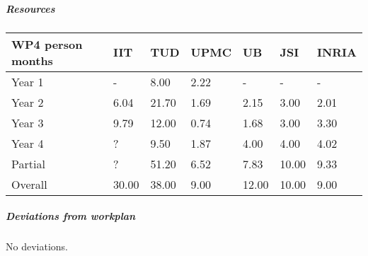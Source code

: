 
\subparagraph*{Resources}

\begin{center}
\begin{tabular}{|C{1.5cm}|C{1.5cm}|C{1.5cm}|C{2cm}|C{2cm}|C{2cm}|C{2cm}|}
\hline
\footnotesize \textbf{WP4 person months}& \footnotesize \textbf{IIT}&\footnotesize \textbf{TUD}&\footnotesize \textbf{UPMC}& \footnotesize \textbf{UB} &\footnotesize \textbf{JSI} &\footnotesize \textbf{INRIA}\\ \hline
\footnotesize Year 1  &  -        & 8.00   & 2.22 & -       & -        & -     \\  \hline
\footnotesize Year 2  &  6.04  & 21.70 & 1.69 & 2.15 & 3.00   & 2.01     \\  \hline
\footnotesize Year 3  &  9.79  & 12.00 & 0.74 & 1.68 & 3.00   & 3.30 \\  \hline
\footnotesize Year 4  & ?        & 9.50   & 1.87 & 4.00 & 4.00   & 4.02    \\   	\hline
\footnotesize Partial  & ?        & 51.20 & 6.52 & 7.83 & 10.00 & 9.33    \\
\hline \hline
\footnotesize Overall & 30.00 & 38.00 & 9.00 & 12.00&10.00 & 9.00 \\ \hline
\end{tabular}
\end{center}

\subparagraph*{Deviations from workplan} 

No deviations.

